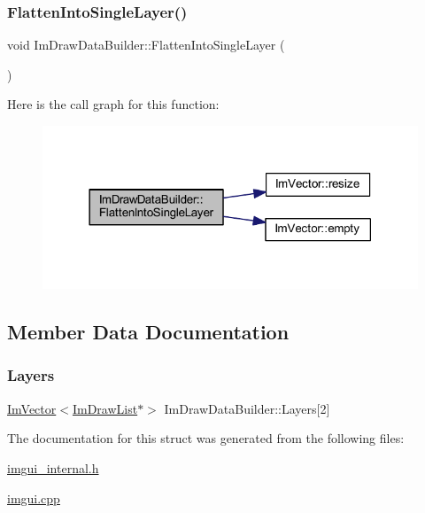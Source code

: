 \subsubsection{\texorpdfstring{Flatten\+Into\+Single\+Layer()}{FlattenIntoSingleLayer()}}
{\footnotesize\ttfamily void Im\+Draw\+Data\+Builder\+::\+Flatten\+Into\+Single\+Layer (\begin{DoxyParamCaption}{ }\end{DoxyParamCaption})}

Here is the call graph for this function\+:
\nopagebreak
\begin{figure}[H]
\begin{center}
\leavevmode
\includegraphics[width=318pt]{struct_im_draw_data_builder_a3893445f97c62e9755fa61e37b698487_cgraph}
\end{center}
\end{figure}


\subsection{Member Data Documentation}
\mbox{\label{struct_im_draw_data_builder_a2d03f8c80dac68fc0e2565dd79307dea}} 
\subsubsection{\texorpdfstring{Layers}{Layers}}
{\footnotesize\ttfamily \mbox{\hyperlink{class_im_vector}{Im\+Vector}}$<$\mbox{\hyperlink{struct_im_draw_list}{Im\+Draw\+List}}$\ast$$>$ Im\+Draw\+Data\+Builder\+::\+Layers\mbox{[}2\mbox{]}}



The documentation for this struct was generated from the following files\+:\begin{DoxyCompactItemize}
\item 
\mbox{\hyperlink{imgui__internal_8h}{imgui\+\_\+internal.\+h}}\item 
\mbox{\hyperlink{imgui_8cpp}{imgui.\+cpp}}\end{DoxyCompactItemize}

